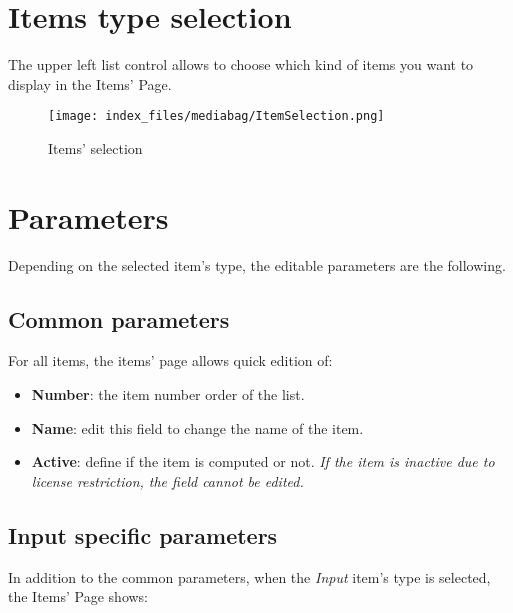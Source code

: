 \documentclass[
  letterpaper,
  DIV=11,
  numbers=noendperiod]{scrreport}
\providecommand{\tightlist}{%
  \setlength{\itemsep}{0pt}\setlength{\parskip}{0pt}}\usepackage{longtable,booktabs,array}
\begin{document}
\hypertarget{items-type-selection}{%
\section{Items type selection}\label{items-type-selection}}

The upper left list control allows to choose which kind of items you
want to display in the Items' Page.

\begin{figure}

{\centering \texttt{[image: index\_files/mediabag/ItemSelection.png]}

}

\caption{Items' selection}

\end{figure}

\hypertarget{parameters}{%
\section{Parameters}\label{parameters}}

Depending on the selected item's type, the editable parameters are the
following.

\hypertarget{common-parameters}{%
\subsection{Common parameters}\label{common-parameters}}

For all items, the items' page allows quick edition of:

\begin{itemize}
\tightlist
\item
  \textbf{Number}: the item number order of the list.
\item
  \textbf{Name}: edit this field to change the name of the item.
\item
  \textbf{Active}: define if the item is computed or not. \emph{If the
  item is inactive due to license restriction, the field cannot be
  edited.}
\end{itemize}

\hypertarget{input-specific-parameters}{%
\subsection{Input specific parameters}\label{input-specific-parameters}}

In addition to the common parameters, when the \emph{Input} item's type
is selected, the Items' Page shows:
\end{document}
